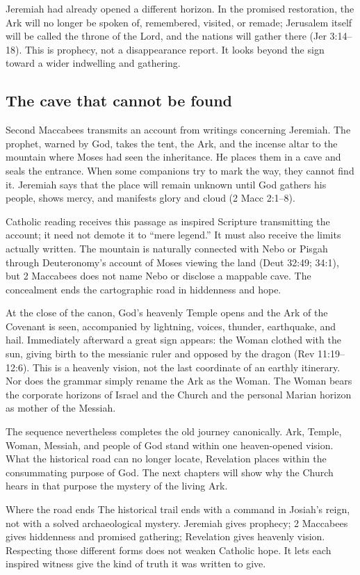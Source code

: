 Jeremiah had already opened a different horizon.  In the promised restoration,
the Ark will no longer be spoken of, remembered, visited, or remade; Jerusalem
itself will be called the throne of the Lord, and the nations will gather there
(Jer 3:14--18).  This is prophecy, not a disappearance report.  It looks beyond
the sign toward a wider indwelling and gathering.

\subsection{The cave that cannot be found}

Second Maccabees transmits an account from writings concerning Jeremiah.  The
prophet, warned by God, takes the tent, the Ark, and the incense altar to the
mountain where Moses had seen the inheritance.  He places them in a cave and
seals the entrance.  When some companions try to mark the way, they cannot
find it.  Jeremiah says that the place will remain unknown until God gathers
his people, shows mercy, and manifests glory and cloud
(2 Macc 2:1--8).

Catholic reading receives this passage as inspired Scripture transmitting the
account; it need not demote it to ``mere legend.''  It must also receive the
limits actually written.  The mountain is naturally connected with Nebo or
Pisgah through Deuteronomy's account of Moses viewing the land
(Deut 32:49; 34:1), but 2 Maccabees does not name Nebo or disclose a mappable
cave.  The concealment ends the cartographic road in hiddenness and hope.

At the close of the canon, God's heavenly Temple opens and the Ark of the
Covenant is seen, accompanied by lightning, voices, thunder, earthquake, and
hail.  Immediately afterward a great sign appears: the Woman clothed with the
sun, giving birth to the messianic ruler and opposed by the dragon
(Rev 11:19--12:6).  This is a heavenly vision, not the last coordinate of an
earthly itinerary.  Nor does the grammar simply rename the Ark as the Woman.
The Woman bears the corporate horizons of Israel and the Church and the
personal Marian horizon as mother of the Messiah.

The sequence nevertheless completes the old journey canonically.  Ark,
Temple, Woman, Messiah, and people of God stand within one heaven-opened vision.
What the historical road can no longer locate, Revelation places within the
consummating purpose of God.  The next chapters will show why the Church hears
in that purpose the mystery of the living Ark.

\begin{studybox}{Where the road ends}
The historical trail ends with a command in Josiah's reign, not with a solved
archaeological mystery.  Jeremiah gives prophecy; 2 Maccabees gives hiddenness
and promised gathering; Revelation gives heavenly vision.  Respecting those
different forms does not weaken Catholic hope.  It lets each inspired witness
give the kind of truth it was written to give.
\end{studybox}
